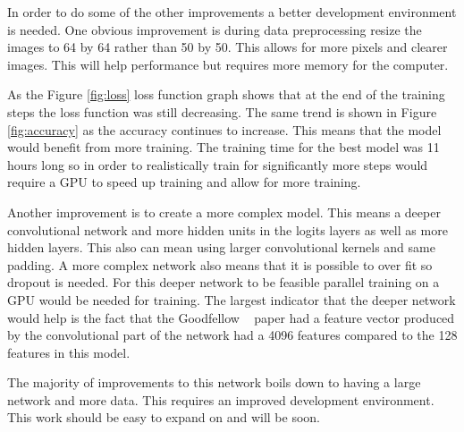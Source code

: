\documentclass[12pt,twocolumn,letterpaper]{article}
\begin{document}
In order to do some of the other improvements a better development environment 
is needed. One obvious improvement is during data preprocessing resize the images 
to 64 by 64 rather than 50 by 50. This allows for more pixels and clearer images. 
This will help performance but requires more memory for the computer.

As the Figure \ref{fig:loss} loss function graph shows that at the end of the training steps 
the loss function was still decreasing. The same trend is shown in Figure \ref{fig:accuracy} as 
the accuracy continues to increase. This means that the model would benefit from
more training. The training time for the best model was 11 hours long so in order 
to realistically train for significantly more steps would require a GPU to speed 
up training and allow for more training.

Another improvement is to create a more complex model. This means a deeper 
convolutional network and more hidden units in the logits layers as well as more 
hidden layers. This also can mean using larger convolutional kernels and same 
padding. A more complex network also means that it is possible to over fit so 
dropout is needed. For this deeper network to be feasible parallel training on a 
GPU would be needed for training. The largest indicator that the deeper network 
would help is the fact that the Goodfellow \etal ~\cite{goodfellow} paper had a 
feature vector produced by the convolutional part of the network had a 4096 
features compared to the 128 features in this model.

The majority of improvements to this network boils down to having a large network 
and more data. This requires an improved development environment. This work 
should be easy to expand on and will be soon. 

{\small


}
\end{document}
